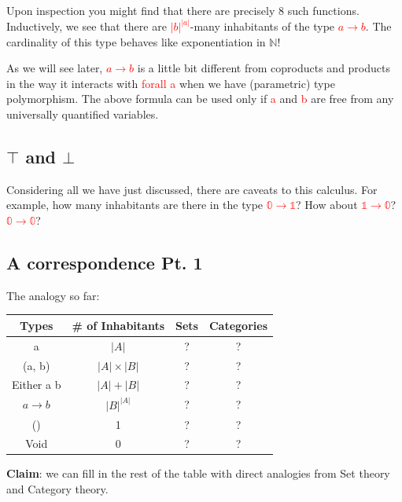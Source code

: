 \documentclass[tikz]{beamer}
\newcommand{\zero}{\bm{\mathbb{0}}}
\newcommand{\one}{\bm{\mathbb{1}}}
\newcommand{\red}[1]{\textcolor{red}{#1}}
\newcommand{\mred}[1]{\textcolor{red}{$#1$}}
\theoremstyle{definition}
\begin{document}
\frame
{
	Upon inspection you might find that there are precisely 8 such functions. Inductively, we see that there are \mred{|b|^{|a|}}-many inhabitants of the type \mred{a \to b}. The cardinality of this type behaves like exponentiation in $\mathbb{N}$!
}

\frame
{

As we will see later, \mred{a \to b} is a little bit different from coproducts and products in the way it interacts with \red{forall a} when we have (parametric) type polymorphism. The above formula can be used only if \red{a} and \red{b} are free from any universally quantified variables.

}
\subsection{$\top$ and $\bot$}

\frame
{
	Considering all we have just discussed, there are caveats to this calculus. For example, how many inhabitants are there in the type \mred{\zero \to \one}? How about \mred{\one \to \zero}? \mred{\zero \to \zero}?
}

\subsection{A correspondence Pt. 1}
\frame
{
	The analogy so far: 
	
	\begin{center}
		\begin{tabular}{|c|c|c|c|}
			\hline
			Types & \# of Inhabitants  & Sets & Categories \\
			\hline a       & $|A|$ & ?  & ? \\
			(a, b) &  $|A| \times |B| $ & ? & ? \\
			Either a b & $|A| + |B|$ & ? & ? \\
			$a \to b$ & $|B|^{|A|}$ & ? & ? \\
			() & 1 & ? & ? \\
			Void & 0 & ? & ? \\ \hline
		\end{tabular}
	\end{center}

}

\frame
{ 
	\textbf{Claim}: we can fill in the rest of the table with direct analogies from Set theory and Category theory. 
}
\end{document}
